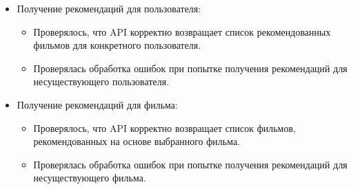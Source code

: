 \begin{itemize}
    \item Получение рекомендаций для пользователя:
    \begin{itemize}
        \item Проверялось, что API корректно возвращает список рекомендованных фильмов для конкретного пользователя.
        \item Проверялась обработка ошибок при попытке получения рекомендаций для несуществующего пользователя.
    \end{itemize}
    \item Получение рекомендаций для фильма:
    \begin{itemize}
        \item Проверялось, что API корректно возвращает список фильмов, рекомендованных на основе выбранного фильма.
        \item Проверялась обработка ошибок при попытке получения рекомендаций для несуществующего фильма.
    \end{itemize}
\end{itemize}


\endinput
